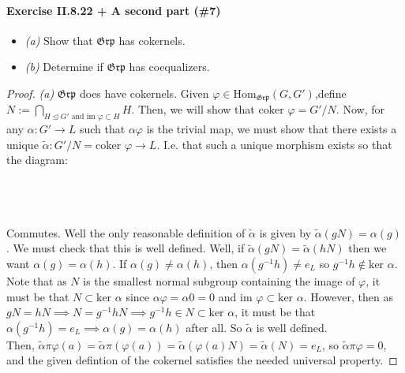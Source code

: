 \documentclass[12pt,letterpaper]{article}
\begin{document}
\paragraph{Exercise II.8.22 + A second part (\#7)} 
\begin{itemize}
	\item\textit{(a)} Show that $\mathfrak{Grp}$ has cokernels.
	\item\textit{(b)} Determine if $\mathfrak{Grp}$ has coequalizers.
\end{itemize}
\begin{proof}
	\item\textit{(a)} $\mathfrak{Grp}$ does have cokernels. Given $\varphi \in \mathrm{Hom}_{\mathfrak{Grp}}(G,G')$,define $N := \bigcap_{H \trianglelefteq G' \text{ and } \text{im }\varphi \subset H} H$. Then, we will show that $\text{coker }\varphi = G'/N$. Now, for any $\alpha : G' \rightarrow L$ such that $\alpha\varphi$ is the trivial map, we must show that there exists a unique $\tilde\alpha : G'/N = \text{coker }\varphi \rightarrow L$. I.e. that such a unique morphism exists so that the diagram:\\\\
	\\\\
	Commutes. Well the only reasonable definition of $\tilde\alpha$ is given by $\tilde\alpha(gN) = \alpha(g)$. We must check that this is well defined. Well, if $\tilde\alpha(gN) = \tilde\alpha(hN)$ then we want $\alpha(g) = \alpha(h)$. If $\alpha(g) \not = \alpha(h)$, then $\alpha(g^{-1}h) \not= e_L$ so $g^{-1}h\not\in \text{ker }\alpha$. Note that as $N$ is the smallest normal subgroup containing the image of $\varphi$, it must be that $N \subset \text{ker }\alpha$ since $\alpha\varphi = \alpha0 = 0$ and $\text{im }\varphi \subset \text{ker }\alpha$. However, then as $gN = hN \implies N = g^{-1}hN \implies g^{-1}h\in N \subset \text{ker }\alpha$, it must be that $\alpha(g^{-1}h) = e_L \implies \alpha(g) = \alpha(h)$ after all. So $\tilde\alpha$ is well defined.\\
	Then, $\tilde\alpha\pi\varphi(a) = \tilde\alpha\pi(\varphi(a)) = \tilde\alpha(\varphi(a)N) = \tilde\alpha(N) = e_L$, so $\tilde\alpha\pi\varphi = 0$, and the given defintion of the cokernel satisfies the needed universal property.
	

\end{proof}
\end{document}
